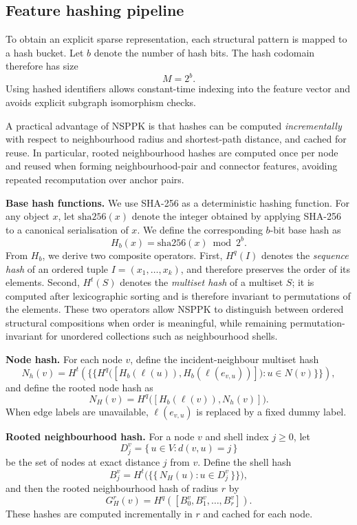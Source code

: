 \subsection{Feature hashing pipeline}

To obtain an explicit sparse representation, each structural pattern is mapped
to a hash bucket. Let $b$ denote the number of hash bits. The hash codomain therefore has size
\[
M = 2^b.
\]
Using hashed identifiers allows constant-time indexing into the feature vector
and avoids explicit subgraph isomorphism checks.

A practical advantage of NSPPK is that hashes can be computed
\emph{incrementally} with respect to neighbourhood radius and shortest-path
distance, and cached for reuse. In particular, rooted neighbourhood hashes are
computed once per node and reused when forming neighbourhood-pair and connector
features, avoiding repeated recomputation over anchor pairs.

\textbf{Base hash functions.}
We use SHA-256 as a deterministic hashing function. For any object $x$, let
$\mathrm{sha256}(x)$ denote the integer obtained by applying SHA-256 to a
canonical serialisation of $x$. We define the corresponding $b$-bit base hash as
\[
H_b(x)=\mathrm{sha256}(x)\bmod 2^b.
\]
From $H_b$, we derive two composite operators. First, $H^q(I)$ denotes the
\emph{sequence hash} of an ordered tuple $I=(x_1,\dots,x_k)$, and therefore
preserves the order of its elements. Second, $H^t(S)$ denotes the
\emph{multiset hash} of a multiset $S$; it is computed after lexicographic
sorting and is therefore invariant to permutations of the elements. These two
operators allow NSPPK to distinguish between ordered structural compositions
when order is meaningful, while remaining permutation-invariant for unordered
collections such as neighbourhood shells.

\textbf{Node hash.}
For each node $v$, define the incident-neighbour multiset hash
\[
N_h(v)
=
H^t\!\left(
\{\!\!\{
H^q\big([H_b(\ell(u)), H_b(\ell(e_{v,u}))]\big)
:
u \in N(v)
\}\!\!\}
\right),
\]
and define the rooted node hash as
\[
N_H(v)
=
H^q\big([H_b(\ell(v)), N_h(v)]\big).
\]
When edge labels are unavailable, $\ell(e_{v,u})$ is replaced by a fixed dummy
label.

\textbf{Rooted neighbourhood hash.}
For a node $v$ and shell index $j\ge 0$, let
\[
D_j^v=\{\,u\in V : d(v,u)=j\,\}
\]
be the set of nodes at exact distance $j$ from $v$. Define the shell hash
\[
B_j^v
=
H^t\bigl(\{\!\!\{\,N_H(u) : u\in D_j^v\,\}\!\!\}\bigr),
\]
and then the rooted neighbourhood hash of radius $r$ by
\[
G_H^r(v)
=
H^q([B_0^v,B_1^v,\dots,B_r^v]).
\]
These hashes are computed incrementally in $r$ and cached for each node.


